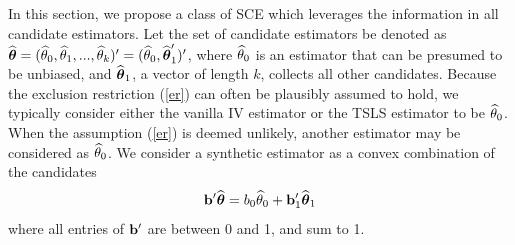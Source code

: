 \documentclass{article}
\begin{document}
In this section, we propose a class of SCE which leverages the information in all candidate estimators. 
Let the set of candidate estimators be denoted as ${\widehat{\boldsymbol{\theta}}} = ({\widehat\theta}_0, {\widehat\theta}_1, ..., {\widehat\theta}_k)' = ({\widehat\theta}_0, {\widehat{\boldsymbol{\theta}}}_1')'$, where ${\widehat\theta}_0$ is an estimator that can be presumed to be unbiased, and ${\widehat{\boldsymbol{\theta}}}_1$, a vector of length $k$, collects all other candidates.  Because the exclusion restriction (\ref{er}) can often be plausibly assumed to hold, we typically consider either the vanilla IV estimator or the TSLS estimator to be ${\widehat\theta}_0$.  When the assumption (\ref{er}) is deemed unlikely, another estimator may be considered as ${\widehat\theta}_0$. We consider a synthetic estimator as a convex combination of the candidates \[
{\bf b}'{\widehat{\boldsymbol{\theta}}} = b_0{\widehat\theta}_0 + {\bf b}_1'{\widehat{\boldsymbol{\theta}}}_1
\]
where all entries of ${\bf b}'$ are between 0 and 1, and sum to 1. 
\end{document}

